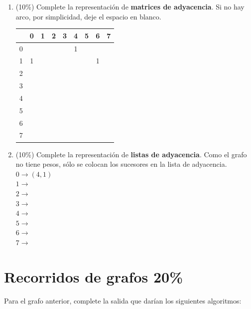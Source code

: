 \documentclass[twocolumn]{article}
\begin{document}
\begin{enumerate}[label=\Alph*]
	\item (10\%) Complete la representación de \textbf{matrices de adyacencia}. Si no hay arco,
  por simplicidad, deje el espacio en blanco.

\begin{center}
\begin{tabular}{| c | c | c | c | c | c | c | c | c |}
\hline
  & 0 & 1 & 2 & 3 & 4 & 5 & 6 & 7 \\
\hline
0 &   &   &   &   & 1  &   &   &   \\
\hline
1 &  1 &   &   &   &   &   &  1 &   \\
\hline
2 &   &   &   &   &   &   &   &   \\
\hline
3 &   &   &   &   &   &   &   &   \\
\hline
4 &   &   &   &   &   &   &   &   \\
\hline
5 &   &   &   &   &   &   &   &   \\
\hline
6 &   &   &   &   &   &   &   &   \\
\hline
7 &   &   &   &   &   &   &   &   \\ 
\hline
\end{tabular}
\end{center}

	\item (10\%) Complete la representación de \textbf{listas de adyacencia}. Como
  el grafo no tiene pesos, sólo se colocan los sucesores en la lista de adyacencia.\\


$0 \rightarrow (4,1)$\\
$1 \rightarrow$\\
$2 \rightarrow$\\
$3 \rightarrow$\\
$4 \rightarrow$\\
$5 \rightarrow$\\
$6 \rightarrow$\\
$7 \rightarrow$\\


\end{enumerate}



\section{Recorridos de grafos 20\%}

Para el grafo anterior, complete la salida
que darían los siguientes algoritmos:
\end{document}
